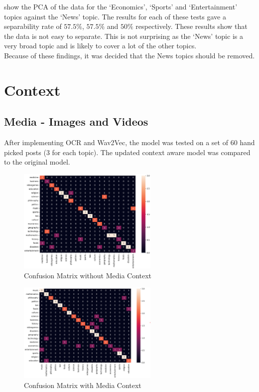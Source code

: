  show the PCA of the data for the `Economics', `Sports' and `Entertainment' topics against the `News' topic. The results for each
of these tests gave a separability rate of $57.5\%$, $57.5\%$ and $50\%$ respectively. These results show that the data is not easy to separate.
This is not surprising as the `News' topic is a very broad topic and is likely to cover a lot of the other topics.\\
Because of these findings, it was decided that the News topics should be removed.
\section{Context}
\subsection{Media - Images and Videos}
After implementing OCR and Wav2Vec, the model was tested on a set of 60 hand picked posts (3 for each topic). The updated context aware
model was compared to the original model.
\begin{figure}[hbtp]
    \centering
    \includegraphics[width=0.6\textwidth]{../images/confusion/Complete-no-media-confusion.png}
    \caption{Confusion Matrix without Media Context}
    \label{fig:confusion}
\end{figure}
\begin{figure}[hbtp]
    \centering
    \includegraphics[width=0.6\textwidth]{../images/confusion/Complete-Model-test.png}
    \caption{Confusion Matrix with Media Context}
    \label{fig:media}
\end{figure}

